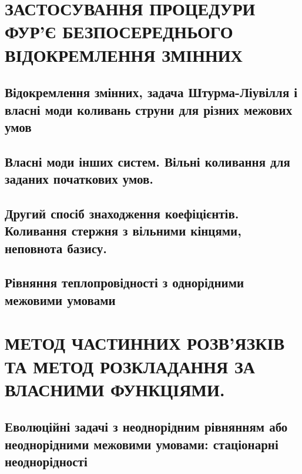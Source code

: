 \documentclass[a4paper, 14pt]{extreport}
\begin{document}
\tableofcontents
\setcounter{page}{2}


\part{ЗАСТОСУВАННЯ ПРОЦЕДУРИ ФУР’Є БЕЗПОСЕРЕДНЬОГО ВІДОКРЕМЛЕННЯ ЗМІННИХ}

\chapter{Відокремлення змінних, задача Штурма-Ліувілля і власні моди коливань струни для різних межових умов}


\chapter{Власні моди інших систем. Вільні коливання для заданих початкових умов.}

\vspace{2cm}


\chapter{Другий спосіб знаходження коефіцієнтів. Коливання стержня з вільними кінцями, неповнота базису.}



\chapter{Рівняння теплопровідності з однорідними межовими умовами}

\vspace{2cm}



\part{МЕТОД ЧАСТИННИХ РОЗВ’ЯЗКІВ ТА МЕТОД РОЗКЛАДАННЯ ЗА ВЛАСНИМИ ФУНКЦІЯМИ.}

\chapter{Еволюційні задачі з неоднорідним рівнянням або неоднорідними межовими умовами: стаціонарні неоднорідності}


\end{document}
